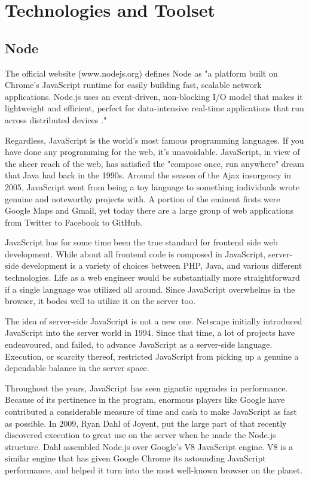 \documentclass[../thesis.tex]{subfiles}
\begin{document}
\section{Technologies and Toolset}

\subsection{Node}
The official website (www.nodejs.org) defines Node as "a platform built on Chrome's JavaScript runtime for easily building fast, scalable network applications. Node.js uses an event-driven, non-blocking I/O model that makes it lightweight and efficient, perfect for data-intensive real-time applications that run across distributed devices \cite{node}."
\linebreak

Regardless, JavaScript is the world's most famous programming languages. If you have done any programming for the web, it's unavoidable. JavaScript, in view of the sheer reach of the web, has satisfied the "compose once, run anywhere" dream that Java had back in the 1990s.  
Around the season of the Ajax insurgency in 2005, JavaScript went from being a toy language to something individuals wrote genuine and noteworthy projects with. A portion of the eminent firsts were Google Maps and Gmail, yet today there are a large group of web applications from Twitter to Facebook to GitHub.
\linebreak

JavaScript has for some time been the true standard for frontend side web development. While about all frontend code is composed in JavaScript, server-side development is a variety of choices between PHP, Java, and various different technologies. Life as a web engineer would be substantially more straightforward if a single language was utilized all around. Since JavaScript overwhelms in the browser, it bodes well to utilize it on the server too. 
\linebreak

The idea of server-side JavaScript is not a new one. Netscape initially introduced JavaScript into the server world in 1994. Since that time, a lot of projects have endeavoured, and failed, to advance JavaScript as a server-side language. Execution, or scarcity thereof, restricted JavaScript from picking up a genuine a dependable balance in the server space. 
\linebreak

Throughout the years, JavaScript has seen gigantic upgrades in performance. Because of its pertinence in the program, enormous players like Google have contributed a considerable measure of time and cash to make JavaScript as fast as possible. In 2009, Ryan Dahl of Joyent, put the large part of that recently discovered execution to great use on the server when he made the Node.js structure. Dahl assembled Node.js over Google's V8 JavaScript engine. V8 is a similar engine that has given Google Chrome its astounding JavaScript performance, and helped it turn into the most well-known browser on the planet.
\newpage
\end{document}
